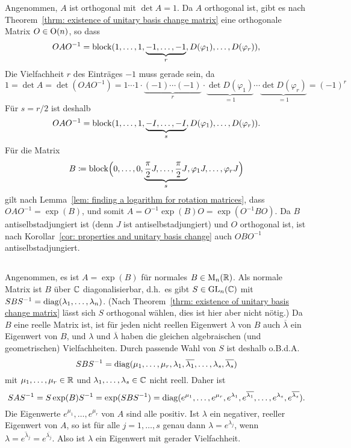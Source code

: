 \documentclass[a4paper, 10pt, numbers=noenddot]{scrartcl}
\begin{document}
Angenommen, $A$ ist orthogonal mit $\det A = 1$.
Da $A$ orthogonal ist, gibt es nach Theorem~\ref{thrm: existence of unitary basis change matrix} eine orthogonale Matrix $O \in \operatorname{O}(n)$, so dass
\[
    O A O^{-1}
  = \operatorname{\operatorname{block}}(1, \dotsc, 1, \underbrace{-1, \dotsc, -1}_{r}, D(\varphi_1), \dotsc, D(\varphi_r)),
\]
Die Vielfachheit $r$ des Einträges $-1$ muss gerade sein, da
\[
    1
  = \det A
  = \det(O A O^{-1})
  = 1 \dotsm 1
    \cdot \underbrace{(-1) \dotsm (-1)}_{r}
    \cdot \underbrace{\det D(\varphi_1)}_{=1} \dotsm \underbrace{\det D(\varphi_r)}_{=1}
  = (-1)^r
\]
Für $s = r/2$ ist deshalb
\[
    O A O^{-1}
  = \operatorname{\operatorname{block}}(1, \dotsc, 1, \underbrace{-I, \dotsc, -I}_{s}, D(\varphi_1), \dotsc, D(\varphi_r)).
\]
Für die Matrix
\[
            B
  \coloneqq \operatorname{\operatorname{block}}\Bigl(0, \dotsc, 0,
                        \underbrace{\frac{\pi}{2} J, \dotsc, \frac{\pi}{2} J}_{s},
                        \varphi_1 J, \dotsc, \varphi_r J
                  \Bigr)
\]
gilt nach Lemma~\ref{lem: finding a logarithm for rotation matrices}, dass $O A O^{-1} = \exp(B)$, und somit $A = O^{-1} \exp(B) O = \exp(O^{-1} B O)$.
Da $B$ antiselbstadjungiert ist (denn $J$ ist antiselbstadjungiert) und $O$ orthogonal ist, ist nach Korollar~\ref{cor: properties and unitary basis change} auch $O B O^{-1}$ antiselbstadjungiert.





\subsection{}

Angenommen, es ist $A = \exp(B)$ für normales $B \in \operatorname{M}_n(\mathbb{R})$.
Als normale Matrix ist $B$ über $\mathbb{C}$ diagonalisierbar, d.h.\ es gibt $S \in \operatorname{GL}_n(\mathbb{C})$ mit $S B S^{-1} = \operatorname{\operatorname{diag}}(\lambda_1, \dotsc, \lambda_n)$.
(Nach Theorem~\ref{thrm: existence of unitary basis change matrix} lässt sich $S$ orthogonal wählen, dies ist hier aber nicht nötig.)
Da $B$ eine reelle Matrix ist, ist für jeden nicht reellen Eigenwert $\lambda$ von $B$ auch $\overline{\lambda}$ ein Eigenwert von $B$, und $\lambda$ und $\overline{\lambda}$ haben die gleichen algebraischen (und geometrischen) Vielfachheiten.
Durch passende Wahl von $S$ ist deshalb o.B.d.A.
\[
    S B S^{-1}
  = \operatorname{\operatorname{diag}}(\mu_1, \dotsc, \mu_r, \lambda_1, \overline{\lambda_1}, \dotsc, \lambda_s, \overline{\lambda_s})
\]
mit $\mu_1, \dotsc, \mu_r \in \mathbb{R}$ und $\lambda_1, \dotsc, \lambda_s \in \mathbb{C}$ nicht reell.
Daher ist
\[
    S A S^{-1}
  = S \exp(B) S^{-1}
  = \exp(S B S^{-1})
  = \operatorname{\operatorname{diag}}(e^{\mu_1}, \dotsc, e^{\mu_r},
          e^{\lambda_1}, e^{\overline{\lambda_1}}, \dotsc, e^{\lambda_s}, e^{\overline{\lambda_s}}) .
\]
Die Eigenwerte $e^{\mu_1}, \dotsc, e^{\mu_r}$ von $A$ sind alle positiv.
Ist $\lambda$ ein negativer, reeller Eigenwert von $A$, so ist für alle $j = 1, \dotsc, s$ genau dann $\lambda = e^{\lambda_j}$, wenn $\lambda = \overline{e^{\lambda_j}} = e^{\overline{\lambda_j}}$.
Also ist $\lambda$ ein Eigenwert mit gerader Vielfachheit.
\end{document}
